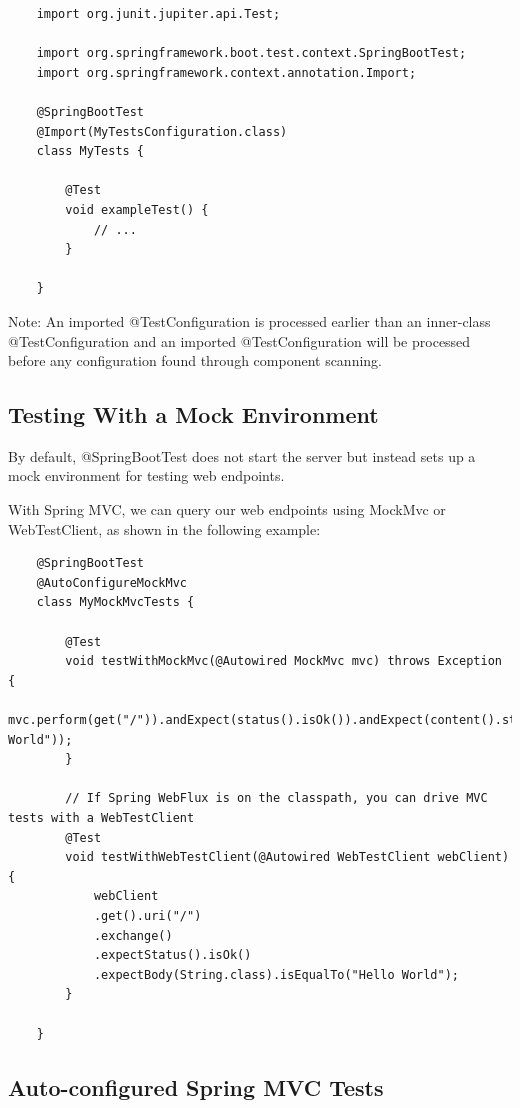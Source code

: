 \documentclass{scrartcl}
\begin{document}
\begin{lstlisting}
    import org.junit.jupiter.api.Test;

    import org.springframework.boot.test.context.SpringBootTest;
    import org.springframework.context.annotation.Import;

    @SpringBootTest
    @Import(MyTestsConfiguration.class)
    class MyTests {

        @Test
        void exampleTest() {
            // ...
        }

    }
\end{lstlisting}

Note: An imported @TestConfiguration is processed earlier than an inner-class @TestConfiguration and an imported @TestConfiguration will be processed before any configuration found through component scanning.

\subsection{Testing With a Mock Environment}

By default, @SpringBootTest does not start the server but instead sets up a mock environment for testing web endpoints.

With Spring MVC, we can query our web endpoints using MockMvc or WebTestClient, as shown in the following example:

\begin{lstlisting}
    @SpringBootTest
    @AutoConfigureMockMvc
    class MyMockMvcTests {

        @Test
        void testWithMockMvc(@Autowired MockMvc mvc) throws Exception {
            mvc.perform(get("/")).andExpect(status().isOk()).andExpect(content().string("Hello World"));
        }

        // If Spring WebFlux is on the classpath, you can drive MVC tests with a WebTestClient
        @Test
        void testWithWebTestClient(@Autowired WebTestClient webClient) {
            webClient
            .get().uri("/")
            .exchange()
            .expectStatus().isOk()
            .expectBody(String.class).isEqualTo("Hello World");
        }

    }

\end{lstlisting}

\subsection{Auto-configured Spring MVC Tests}
\end{document}
